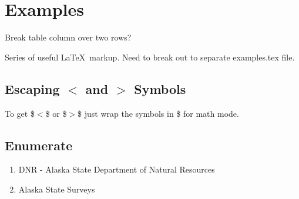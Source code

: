 
\newpage
\section{Examples}
\begin{itemize*}
     \item{} Break table column over two rows?
\end{itemize*}

Series of useful \LaTeX\ markup. Need to break out to 
separate examples.tex file.

\subsection{Escaping $<$ and $>$ Symbols}
To get \$$<$\$ or \$$>$\$ just wrap the symbols in \$ for math mode.

\subsection{Enumerate}
\begin{enumerate}
  \item{DNR} - Alaska State Department of Natural Resources

  \item{Alaska State Surveys}
\end{enumerate}

